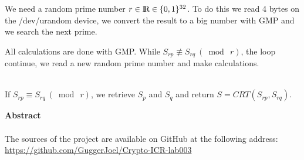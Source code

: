 \documentclass[a4paper]{report}
\def\R{\textrm{I\kern-0.21emR}}
\begin{document}

We need a random prime number $r \in \R \in \{0,1\}^{32}$. To do this we read 4 bytes on the /dev/urandom device, we convert the result to a big number with GMP and we search the next prime.


All calculations are done with GMP. While $S_{rp} \not\equiv S_{rq}\ (\bmod\ r)$, the loop continue, we read a new random prime number and make calculations.

\
\\
If $S_{rp} \equiv S_{rq}\ (\bmod\ r)$, we retrieve $S_{p}$ and $S_{q}$ and return $S = CRT(S_{rp}, S_{rq})$.


\newpage
\vspace*{6 cm}
\begin{center}
\textbf{Abstract} \\
\ \\
The sources of the project are available on GitHub at the following address: \\
\href{https://github.com/GuggerJoel/Crypto-ICR-lab003}{\url{https://github.com/GuggerJoel/Crypto-ICR-lab003}}
\end{center}
\end{document}
